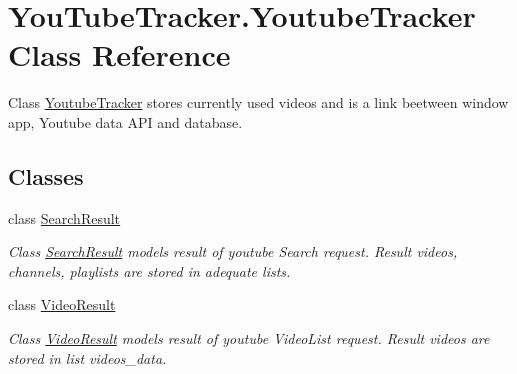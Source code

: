 \hypertarget{class_you_tube_tracker_1_1_youtube_tracker}{}\section{You\+Tube\+Tracker.\+Youtube\+Tracker Class Reference}
\label{class_you_tube_tracker_1_1_youtube_tracker}


Class {\ttfamily \mbox{\hyperlink{class_you_tube_tracker_1_1_youtube_tracker}{Youtube\+Tracker}}} stores currently used videos and is a link beetween window app, Youtube data A\+PI and database.  


\subsection*{Classes}
\begin{DoxyCompactItemize}
\item 
class \mbox{\hyperlink{class_you_tube_tracker_1_1_youtube_tracker_1_1_search_result}{Search\+Result}}
\begin{DoxyCompactList}\small\item\em Class {\ttfamily \mbox{\hyperlink{class_you_tube_tracker_1_1_youtube_tracker_1_1_search_result}{Search\+Result}}} models result of youtube Search request. Result videos, channels, playlists are stored in adequate lists. \end{DoxyCompactList}\item 
class \mbox{\hyperlink{class_you_tube_tracker_1_1_youtube_tracker_1_1_video_result}{Video\+Result}}
\begin{DoxyCompactList}\small\item\em Class {\ttfamily \mbox{\hyperlink{class_you_tube_tracker_1_1_youtube_tracker_1_1_video_result}{Video\+Result}}} models result of youtube Video\+List request. Result videos are stored in list {\ttfamily videos\+\_\+data}. \end{DoxyCompactList}\end{DoxyCompactItemize}
